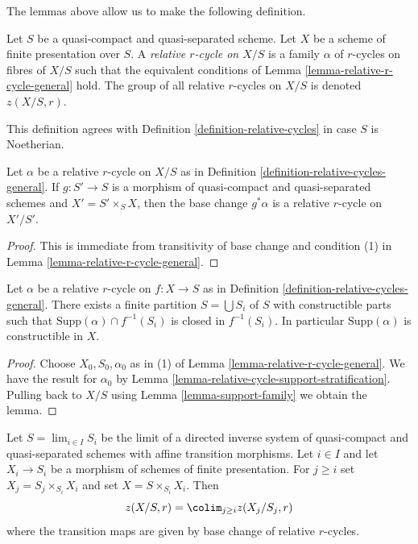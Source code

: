 \noindent
The lemmas above allow us to make the following definition.

\begin{definition}
\label{definition-relative-cycles-general}
Let $S$ be a quasi-compact and quasi-separated scheme.
Let $X$ be a scheme of finite presentation over $S$.
A {\it relative $r$-cycle on $X/S$} is a family $\alpha$ of $r$-cycles
on fibres of $X/S$ such that the equivalent conditions of
Lemma \ref{lemma-relative-r-cycle-general} hold.
The group of all relative $r$-cycles on $X/S$ is denoted $z(X/S, r)$.
\end{definition}

\noindent
This definition agrees with Definition \ref{definition-relative-cycles}
in case $S$ is Noetherian.

\begin{lemma}
\label{lemma-base-change-relative-cycle-general}
Let $\alpha$ be a relative $r$-cycle on $X/S$ as in
Definition \ref{definition-relative-cycles-general}.
If $g : S' \to S$ is a morphism of quasi-compact and
quasi-separated schemes and $X' = S' \times_S X$, then
the base change $g^*\alpha$ is a relative $r$-cycle on $X'/S'$.
\end{lemma}

\begin{proof}
This is immediate from transitivity of base change and
condition (1) in Lemma \ref{lemma-relative-r-cycle-general}.
\end{proof}

\begin{lemma}
\label{lemma-relative-cycle-support-stratification-general}
Let $\alpha$ be a relative $r$-cycle on $f : X \to S$ as in
Definition \ref{definition-relative-cycles-general}.
There exists a finite partition $S = \bigcup S_i$ of $S$
with constructible parts such that
$\text{Supp}(\alpha) \cap f^{-1}(S_i)$ is closed in $f^{-1}(S_i)$.
In particular $\text{Supp}(\alpha)$ is constructible in $X$.
\end{lemma}

\begin{proof}
Choose $X_0, S_0, \alpha_0$ as in (1) of
Lemma \ref{lemma-relative-r-cycle-general}.
We have the result for $\alpha_0$ by
Lemma \ref{lemma-relative-cycle-support-stratification}.
Pulling back to $X/S$ using Lemma \ref{lemma-support-family}
we obtain the lemma.
\end{proof}

\begin{lemma}
\label{lemma-descend-through-limit-general}
Let $S = \lim_{i \in I} S_i$ be the limit of a directed inverse system of
quasi-compact and quasi-separated schemes with affine transition morphisms.
Let $i \in I$ and let $X_i \to S_i$ be a morphism of schemes of finite
presentation. For $j \geq i$ set $X_j = S_j \times_{S_i} X_i$ and set
$X = S \times_{S_i} X_i$. Then
$$
z(X/S, r) = \colim_{j \geq i} z(X_j/S_j, r)
$$
where the transition maps are given by base change of relative $r$-cycles.
\end{lemma}

